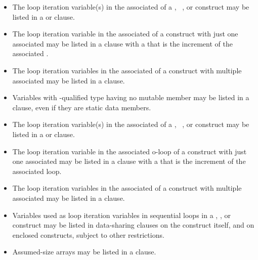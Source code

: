 \ccppspecificstart
\begin{itemize}
\item The loop iteration variable(s) in the associated  of a , 
~, or  construct may be listed in a  or  clause. 

\item The loop iteration variable in the associated  of a  construct with just 
one associated  may be listed in a  clause with a  
that is the increment of the associated .

\item The loop iteration variables in the associated  of a  construct with 
multiple associated  may be listed in a  clause. 

\item Variables with -qualified type having no mutable member may be listed in a
 clause, even if they are static data members.
\end{itemize}
\ccppspecificend

\fortranspecificstart
\begin{itemize}
\item The loop iteration variable(s) in the associated  of a , 
~, or 
construct may be listed in a  or  clause. 

\item The loop iteration variable in the associated o-loop of a  construct with just 
one associated  may be listed in a  clause with a  
that is the increment of the associated loop.

\item The loop iteration variables in the associated  of a  construct with 
multiple associated  may be listed in a  clause. 

\item Variables used as loop iteration variables in sequential loops in a ,  
, or  construct may be listed in data-sharing clauses on the construct itself, and on 
enclosed constructs, subject to other restrictions.

\item Assumed-size arrays may be listed in a  clause.
\end{itemize}
\fortranspecificend

